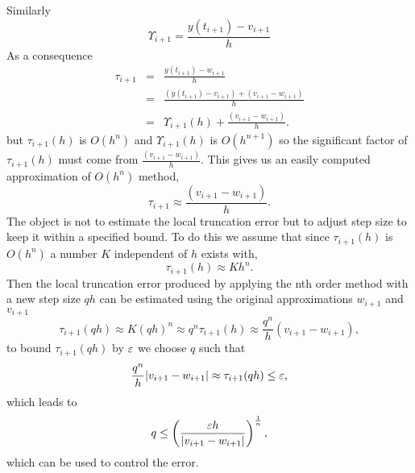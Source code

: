 Similarly
\[ \Upsilon_{i+1} =\frac{y(t_{i+1})-v_{i+1}}{h} \]
As a consequence
\begin{eqnarray*}
\tau_{i+1} &=& \frac{y(t_{i+1})-w_{i+1}}{h} \\
 &=& \frac{(y(t_{i+1})-v_{i+1})+(v_{i+1}-w_{i+1})}{h} \\
 &=& \Upsilon_{i+1}(h)+\frac{(v_{i+1}-w_{i+1})}{h}. 
\end{eqnarray*}
but $\tau_{i+1}(h)$ is $O(h^n)$ and $\Upsilon_{i+1}(h)$ is $O(h^{n+1})$ so the 
significant factor of $\tau_{i+1}(h)$ must come from $\frac{(v_{i+1}-w_{i+1})}{h}$.  This gives us an easily computed approximation of $O(h^n)$ method,
\[\tau_{i+1} \approx \frac{(v_{i+1}-w_{i+1})}{h}.  \]
The object is not to estimate the local truncation error but to adjust step size to 
keep it within a specified bound.  To do this we assume that since $\tau_{i+1}(h)$ is $O(h^n)$ a number $K$ independent of $h$ exists with, \[\tau_{i+1}(h) \approx Kh^n. \]
Then the local truncation error produced by applying the nth order method with a
new step size $qh$ can be estimated using the original approximations $w_{i+1}$ 
and $v_{i+1}$
\[\tau_{i+1}(qh) \approx K(qh)^n \approx q^n\tau_{i+1}(h) \approx \frac{q^n}{h}(v_{i+1}-w_{i+1}), \]
to bound $\tau_{i+1}(qh)$ by $\varepsilon$ we choose $q$ such that
\[\frac{q^n}{h}|v_{i+1}-w_{i+1}|\approx \tau_{i+1}(qh) \leq \varepsilon, \]
which leads to
\[ q \leq \left( \frac{\varepsilon h }{|v_{i+1}-w_{i+1}|}\right)^{\frac{1}{n}}, \]
which can be used to control the error.


\newpage
